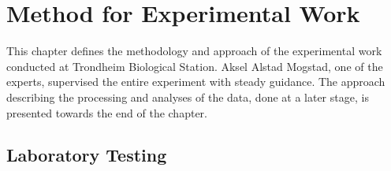 \chapter{Method for Experimental Work}
\label{chap:method}
This chapter defines the methodology and approach of the experimental work conducted at Trondheim Biological Station. Aksel Alstad Mogstad, one of the experts, supervised the entire experiment with steady guidance. The approach describing the processing and analyses of the data, done at a later stage, is presented towards the end of the chapter.

\section{Laboratory Testing}

